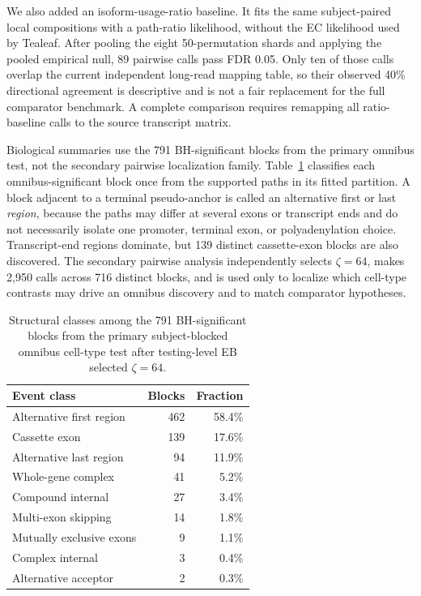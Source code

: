 \documentclass[11pt]{article}
\begin{document}
We also added an isoform-usage-ratio baseline. It fits the same subject-paired local compositions with a path-ratio likelihood, without the EC likelihood used by Tealeaf. After pooling the eight 50-permutation shards and applying the pooled empirical null, 89 pairwise calls pass FDR 0.05. Only ten of those calls overlap the current independent long-read mapping table, so their observed 40\% directional agreement is descriptive and is not a fair replacement for the full comparator benchmark. A complete comparison requires remapping all ratio-baseline calls to the source transcript matrix.

Biological summaries use the 791 BH-significant blocks from the primary omnibus test, not the secondary pairwise localization family. Table~\ref{tab:production-event-types} classifies each omnibus-significant block once from the supported paths in its fitted partition. A block adjacent to a terminal pseudo-anchor is called an alternative first or last \emph{region}, because the paths may differ at several exons or transcript ends and do not necessarily isolate one promoter, terminal exon, or polyadenylation choice. Transcript-end regions dominate, but 139 distinct cassette-exon blocks are also discovered. The secondary pairwise analysis independently selects \(\zeta=64\), makes 2,950 calls across 716 distinct blocks, and is used only to localize which cell-type contrasts may drive an omnibus discovery and to match comparator hypotheses.

\begin{table}[H]
\centering
\scriptsize
\caption{Structural classes among the 791 BH-significant blocks from the primary subject-blocked omnibus cell-type test after testing-level EB selected \(\zeta=64\).}
\label{tab:production-event-types}
\begin{tabular}{lrr}
\toprule
Event class & Blocks & Fraction\\
\midrule
Alternative first region & 462 & 58.4\%\\
Cassette exon & 139 & 17.6\%\\
Alternative last region & 94 & 11.9\%\\
Whole-gene complex & 41 & 5.2\%\\
Compound internal & 27 & 3.4\%\\
Multi-exon skipping & 14 & 1.8\%\\
Mutually exclusive exons & 9 & 1.1\%\\
Complex internal & 3 & 0.4\%\\
Alternative acceptor & 2 & 0.3\%\\
\bottomrule
\end{tabular}
\end{table}
\end{document}
